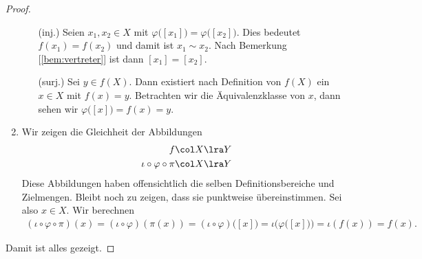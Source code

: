 \begin{satz}
\begin{proof}
\begin{enumerate}
\begin{itemize}
        \item[\tiny{(inj.)}] Seien $x_{1},x_{2}\in X$ mit
          $\varphi\big([x_{1}]\big) = \varphi\big([x_{2}]\big)$. Dies bedeutet
          $f(x_{1}) = f(x_{2})$ und damit ist $x_{1}\sim x_{2}$. Nach
          Bemerkung [\ref{bem:vertreter}] ist dann $[x_{1}] = [x_{2}]$.
        
        \item[\tiny{(surj.)}] Sei $y\in f(X)$. Dann existiert nach
          Definition von $f(X)$ ein $x\in X$ mit $f(x) = y$. Betrachten wir
          die Äquivalenzklasse von $x$, dann sehen wir
          $\varphi\big([x]\big) = f(x) = y$.

      \end{itemize}

    \item Wir zeigen die Gleichheit der Abbildungen
      \begin{align*}
        f &\col X \lra Y \\
        \iota\circ\varphi\circ\pi &\col X \lra Y
      \end{align*}
      Diese Abbildungen haben offensichtlich die selben Definitionsbereiche
      und Zielmengen. Bleibt noch zu zeigen, dass sie punktweise
      übereinstimmen. Sei also $x\in X$. Wir berechnen
      \begin{align*}
        (\iota\circ\varphi\circ\pi)(x) = (\iota\circ\varphi)(\pi(x)) =
        (\iota\circ\varphi)\big([x]\big) = \iota\Big(\varphi\big([x]\big)\Big) =
        \iota(f(x)) = f(x).
      \end{align*}
    \end{enumerate}
    Damit ist alles gezeigt.
    
  \end{proof}

\end{satz}

